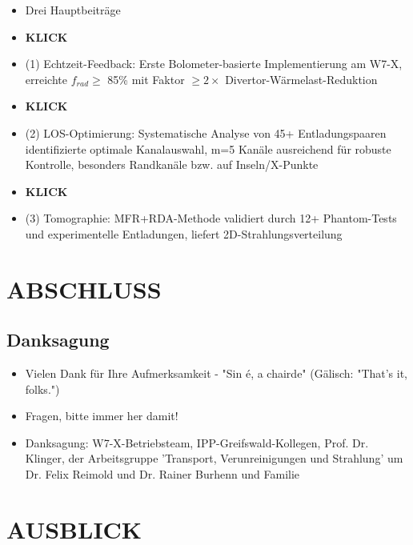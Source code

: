 \documentclass[11pt,a4paper]{article}
\begin{document}
\begin{itemize}
\item Drei Hauptbeiträge
\item \textbf{KLICK}
\item (1) Echtzeit-Feedback: Erste Bolometer-basierte Implementierung am W7-X, erreichte $f_{rad}\geq$ 85\% mit Faktor $\geq2\times$ Divertor-Wärmelast-Reduktion
\item \textbf{KLICK}
\item (2) LOS-Optimierung: Systematische Analyse von 45+ Entladungspaaren identifizierte optimale Kanalauswahl, m=5 Kanäle ausreichend für robuste Kontrolle, besonders Randkanäle bzw. auf Inseln/X-Punkte
\item \textbf{KLICK}
\item (3) Tomographie: MFR+RDA-Methode validiert durch 12+ Phantom-Tests und experimentelle Entladungen, liefert 2D-Strahlungsverteilung
\end{itemize}

\section{ABSCHLUSS}

\subsection{Danksagung}

\begin{itemize}
\item Vielen Dank für Ihre Aufmerksamkeit - "Sin é, a chairde" (Gälisch: "That's it, folks.")
\item Fragen, bitte immer her damit!
\item Danksagung: W7-X-Betriebsteam, IPP-Greifswald-Kollegen, Prof. Dr. Klinger, der Arbeitsgruppe 'Transport, Verunreinigungen und Strahlung' um Dr. Felix Reimold und Dr. Rainer Burhenn und Familie
\end{itemize}


\pagebreak%
\section{AUSBLICK}
\end{document}
